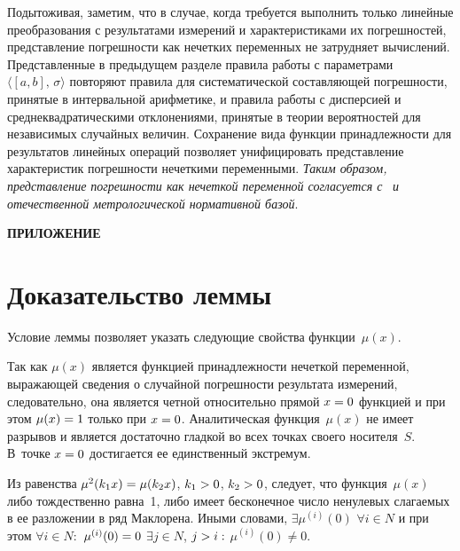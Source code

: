 \begin{multicols}{2}
     Подытоживая, заметим, что в случае, когда требуется выполнить только 
линейные преобразования с результатами измерений и характеристиками их 
погрешностей, представление погрешности как нечетких переменных не 
затрудняет вычислений. Представленные в предыдущем разделе правила 
работы с параметрами $\langle [a,b],\,\sigma\rangle$ повторяют правила для 
систематической составляющей погрешности, принятые в интервальной 
арифметике, и правила работы с дисперсией и среднеквадратическими 
отклонениями, принятые в теории вероятностей для независимых случайных 
величин. Сохранение вида функции принадлежности для результатов линейных 
операций позволяет унифицировать представление характеристик погрешности 
нечеткими переменными. \textit{Таким образом, представление погрешности 
как нечеткой переменной согласуется с}~\cite{8sem} \textit{и отечественной 
метрологической нормативной базой}.


\vspace*{12pt}


\setcounter{equation}{0}
\renewcommand{\theequation}{П.\arabic{equation}}

{{\small \hfill \textbf{ПРИЛОЖЕНИЕ}}}

\vspace*{-24pt}

{\small

\section*{Доказательство леммы}
  
  Условие леммы позволяет указать следующие свойства функции~$\mu(x)$.
  
  Так как $\mu(x)$ является функцией при\-над\-леж\-ности нечеткой переменной, 
выражающей сведения о случайной погрешности результата измерений,  
следовательно, она является четной относительно прямой $x\hm=0$ функцией и 
при этом $\mu(x)\hm=1$ только при $x\hm=0$. Аналитическая 
функция~$\mu(x)$ не имеет разрывов и является достаточно гладкой во всех 
точках своего носителя~$S$. В~точ\-ке $x\hm=0$ достигается ее единственный 
экстремум.
  
  Из равенства $\mu^2(k_1 x)\hm=\mu(k_2 x)$,  $k_1\hm>0$, 
$k_2\hm>0$, следует, что функция~$\mu(x)$ либо тождественно равна~1, либо 
имеет бесконечное число ненулевых слагаемых в ее разложении в ряд 
Маклорена. Иными словами, $\exists \mu^{(i)}(0)$ $\forall i\in N$ и при этом 
$\forall i\in N:$ $\mu^{(i)}(0)\hm=0$ $\exists j\in N$, $j\hm>i:$ 
$\mu^{(i)}(0)\not=0$.
  
}
\end{multicols}
